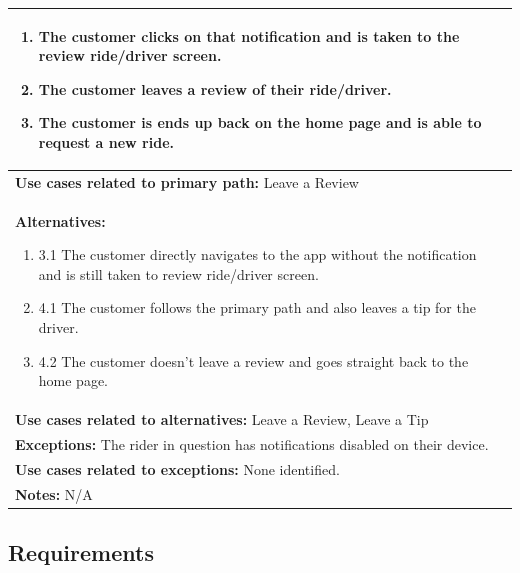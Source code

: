 \documentclass{article}
\begin{document}
\begin{center}
\begin{tabular}[H]{|p{14cm}|p{6cm}|}
\begin{enumerate}
        \item The customer clicks on that notification and is taken to the review ride/driver screen.
        \item The customer leaves a review of their ride/driver.
        \item The customer is ends up back on the home page and is able to request a new ride.
      \end{enumerate} \\
      \hline
      \textbf{Use cases related to primary path:} Leave a Review \\
      \hline
      \textbf{Alternatives:} 
      \begin{enumerate}[label=]
        \item 3.1 The customer directly navigates to the app without the notification and is still taken to review ride/driver screen.
        \item 4.1 The customer follows the primary path and also leaves a tip for the driver.
        \item 4.2 The customer doesn't leave a review and goes straight back to the home page.
      \end{enumerate} \\
      \hline
      \textbf{Use cases related to alternatives:} Leave a Review, Leave a Tip \\
      \hline
      \textbf{Exceptions:} The rider in question has notifications disabled on their device. \\
      \hline
      \textbf{Use cases related to exceptions:} None identified. \\
      \hline
      \textbf{Notes:} N/A \\
      \hline
    \end{tabular}
  \end{center}

    \subsection{Requirements}
\end{document}
